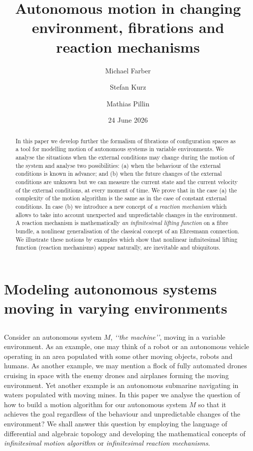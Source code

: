 \documentclass[11pt]{amsart}
\title[Autonomous motion in changing environment]{Autonomous motion in changing environment, fibrations and reaction mechanisms}
\author{Michael Farber}
\author{Stefan Kurz}
\author{Mathias Pillin}
\date{24 June 2026}                                           %
\begin{document}
\begin{abstract} In this paper we develop further the formalism of fibrations of configuration spaces as a tool for modelling motion of
autonomous systems in variable environments. 
We analyse the situations when the external conditions may change during the motion of the system and analyse two possibilities: (a) when the behaviour of the external conditions is known in advance; and (b) when the future changes of the external conditions are unknown but we can measure the current state and the current velocity of the external conditions, at every moment of time. 
We prove that 
in the case (a) 
the complexity of the motion algorithm is the same as in the case of constant external conditions. 
In case (b) we introduce a new concept of {\it a reaction mechanism} which allows to take into account unexpected and unpredictable changes in the environment. A reaction mechanism is mathematically {\it an infinitesimal lifting function} on a fibre bundle, a nonlinear generalisation of the classical concept of an Ehresmann connection. 
We illustrate these notions by examples which show that nonlinear infinitesimal lifting function (reaction mechanisms) appear naturally, are inevitable and ubiquitous.  
\end{abstract}
\maketitle
\section{Modeling autonomous systems moving in varying environments} 
\subsection{} Consider an autonomous system  $M$, {\it \lq\lq the machine\rq\rq},  moving in a variable environment. 
As an example, one may think of a robot or an autonomous vehicle \cite{SSS} operating in an area populated with some other moving objects, robots and humans.
As another example, we may mention a flock of fully automated drones 
cruising in space with the enemy drones and airplanes forming the moving environment. 
Yet another example is an autonomous submarine 
navigating in waters populated with moving mines. 
In this paper we analyse the question of how to build a motion algorithm for our autonomous system $M$ so that it achieves the goal regardless of the behaviour and unpredictable changes of the environment? 
We shall answer this question by employing the language of differential and algebraic topology and developing the mathematical concepts  
of {\it infinitesimal motion algorithm} or {\it infinitesimal reaction mechanisms}. 
\end{document}
